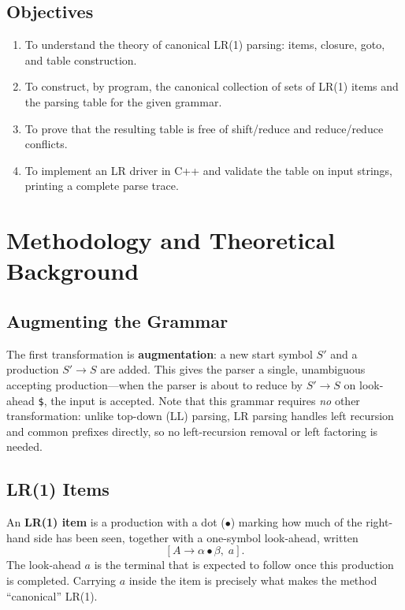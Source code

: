\documentclass[11pt,a4paper]{report}
\begin{document}
\section{Objectives}
\begin{enumerate}
  \item To understand the theory of canonical LR(1) parsing: items, closure, goto, and table construction.
  \item To construct, by program, the canonical collection of sets of LR(1) items and the parsing table for the given grammar.
  \item To prove that the resulting table is free of shift/reduce and reduce/reduce conflicts.
  \item To implement an LR driver in C++ and validate the table on input strings, printing a complete parse trace.
\end{enumerate}

\chapter{Methodology and Theoretical Background}

\section{Augmenting the Grammar}
The first transformation is \textbf{augmentation}: a new start symbol $S'$ and a
production $S' \rightarrow S$ are added. This gives the parser a single,
unambiguous accepting production---when the parser is about to reduce by
$S' \rightarrow S$ on look-ahead \texttt{\$}, the input is accepted. Note that
this grammar requires \emph{no} other transformation: unlike top-down (LL)
parsing, LR parsing handles left recursion and common prefixes directly, so no
left-recursion removal or left factoring is needed.

\section{LR(1) Items}
An \textbf{LR(1) item} is a production with a dot ($\bullet$) marking how much of
the right-hand side has been seen, together with a one-symbol look-ahead, written
\[
[A \rightarrow \alpha \bullet \beta,\; a].
\]
The look-ahead $a$ is the terminal that is expected to follow once this
production is completed. Carrying $a$ inside the item is precisely what makes the
method ``canonical'' LR(1).
\end{document}
